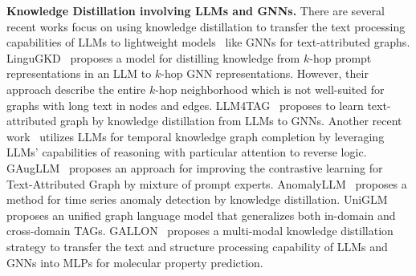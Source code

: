 \textbf{Knowledge Distillation involving LLMs and GNNs.} There are several recent works focus on using knowledge distillation to transfer the text processing capabilities of LLMs to lightweight models~\cite{hsieh2023distilling} like GNNs for text-attributed graphs. 
LinguGKD~\cite{xu2024llm} proposes a model for distilling knowledge from $k$-hop prompt representations in an LLM to $k$-hop GNN representations. However, their approach describe the entire $k$-hop neighborhood which is not well-suited for graphs with long text in nodes and edges. 
LLM4TAG~\cite{pan2024distilling} proposes to learn text-attributed graph by knowledge distillation from LLMs to GNNs. Another recent work~\cite{luo2024chain} utilizes LLMs for temporal knowledge graph completion by leveraging LLMs' capabilities of reasoning with particular attention to reverse logic.
GAugLLM~\cite{fang2024gaugllm} proposes an approach for improving the contrastive learning for Text-Attributed Graph by mixture of prompt experts. AnomalyLLM~\cite{liu2024large} proposes a method for time series anomaly detection by knowledge distillation. UniGLM~\cite{fang2024uniglm} proposes an unified graph language model that generalizes both in-domain and cross-domain TAGs. GALLON~\cite{xu2024llm} proposes a multi-modal knowledge distillation strategy to transfer the text and structure processing capability of LLMs and GNNs into MLPs for molecular property prediction.\\%
